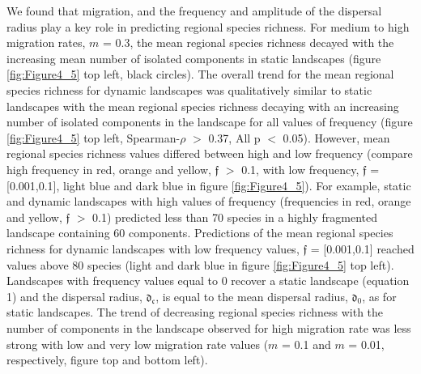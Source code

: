 \documentclass[a4paper,12pt]{article}
\begin{document}
We found that migration, and the frequency and amplitude of the dispersal radius play a key role in predicting regional species richness. For medium to high migration rates, $m$ = 0.3, the mean regional species richness decayed with the increasing mean number of isolated components in static landscapes (figure \ref{fig:Figure4_5} top left, black circles). The overall trend for the mean regional species richness for dynamic landscapes was qualitatively similar to static landscapes with the mean regional species richness decaying with an increasing number of isolated components in the landscape for all values of frequency (figure \ref{fig:Figure4_5} top left, Spearman-$\rho$ $>$ 0.37, All p $<$ 0.05). However, mean regional species richness values differed between high and low frequency (compare high frequency in red, orange and yellow, $\mathfrak{f}$ $>$ 0.1, with low frequency, $\mathfrak{f}$ = [0.001,0.1], light blue and dark blue in figure \ref{fig:Figure4_5}). For example, static and dynamic landscapes with high values of frequency (frequencies in red, orange and yellow, $\mathfrak{f}$ $>$ 0.1) predicted less than 70 species in a highly fragmented landscape containing 60 components. Predictions of the mean regional species richness for dynamic landscapes with low frequency values, $\mathfrak{f}$ = [0.001,0.1] reached values above 80 species (light and dark blue in figure \ref{fig:Figure4_5} top left). Landscapes with frequency values equal to 0 recover a static landscape (equation 1) and the dispersal radius, $\mathfrak{d_{c}}$, is equal to the mean dispersal radius, $\mathfrak{d_{0}}$, as for static landscapes. The trend of decreasing regional species richness with the number of components in the landscape observed for high migration rate was less strong with low and very low migration rate values ($m$ = 0.1 and $m$ = 0.01, respectively, figure  top and bottom left). 
\end{document}
